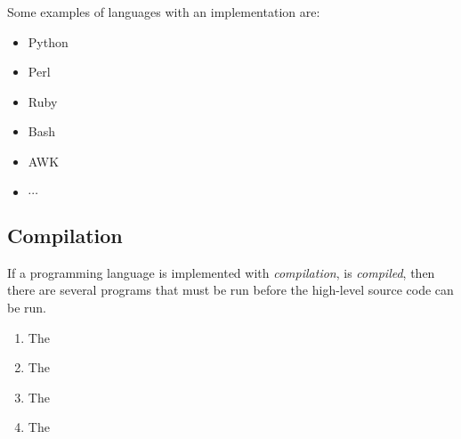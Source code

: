 Some examples of languages with an  implementation are:
\begin{itemize}[noitemsep]
\item Python
\item Perl
\item Ruby
\item Bash
\item AWK
\item $\cdots$
\end{itemize}

\subsection{Compilation}\label{subsec:Compilation}
\begin{definition}[Compilation]\label{def:Compilation}
  If a programming language is implemented with \emph{compilation}, is \emph{compiled}, then there are several programs that must be run before the high-level source code can be run.
  \begin{enumerate}[noitemsep]
  \item The 
  \item The 
  \item The 
  \item The 
  \end{enumerate}
\end{definition}


